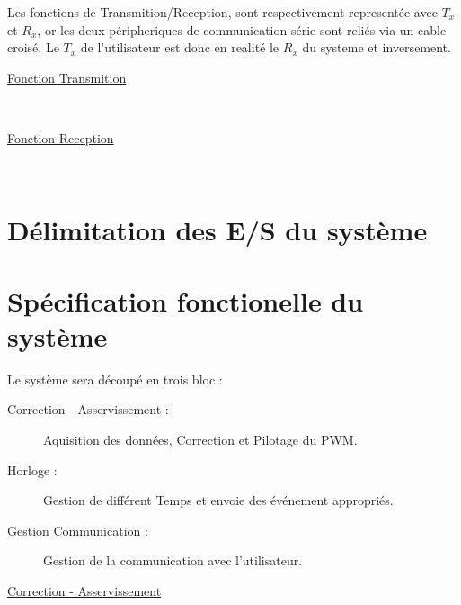 \documentclass[11pt,french]{article} %
\begin{document}
\newpage

Les fonctions de Transmition/Reception, sont respectivement representée avec $T_x$ et $R_x$, or les deux péripheriques de communication série sont reliés via un cable croisé. Le $T_x$ de l'utilisateur est donc en realité le $R_x$ du systeme et inversement.

\begin{minipage}[t, h]{5cm}
\hspace{0.2in}
\underline{Fonction Transmition}
\end{minipage}
~
\begin{minipage}[t, h]{9cm}

\end{minipage}

\begin{minipage}[t, h]{5cm}
\hspace{0.2in}
\underline{Fonction Reception}
\end{minipage}
~
\begin{minipage}[t, h]{9cm}

\end{minipage}

\section{Délimitation des E/S du système}



\section{Spécification fonctionelle du système}

Le système sera découpé en trois bloc :
\vspace{0.1in}
\begin{description}
\item[Correction - Asservissement : ] Aquisition des données, Correction et Pilotage du PWM.
\item[Horloge : ] Gestion de différent Temps et envoie des événement appropriés.
\item[Gestion Communication : ] Gestion de la communication avec l'utilisateur.
\end{description}

\vspace{0.2in}
\underline{Correction - Asservissement}

\begin{center}

\end{center}
\end{document}
